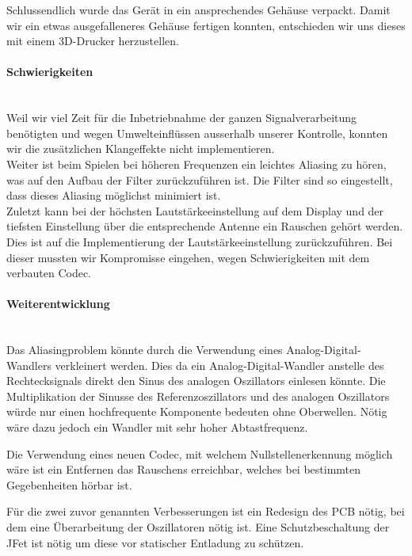 Schlussendlich wurde das Gerät in ein ansprechendes Gehäuse verpackt. Damit wir ein etwas ausgefalleneres Gehäuse fertigen konnten, entschieden wir uns dieses mit einem 3D-Drucker herzustellen.

\paragraph{Schwierigkeiten}\mbox{}\\

Weil wir viel Zeit für die Inbetriebnahme der ganzen Signalverarbeitung benötigten und wegen Umwelteinflüssen ausserhalb unserer Kontrolle, konnten wir die zusätzlichen Klangeffekte nicht implementieren.\\
Weiter ist beim Spielen bei höheren Frequenzen ein leichtes Aliasing zu hören, was auf den Aufbau der Filter zurückzuführen ist. Die Filter sind so eingestellt, dass dieses Aliasing möglichst minimiert ist.\\
Zuletzt kann bei der höchsten Lautstärkeeinstellung auf dem Display und der tiefsten Einstellung über die entsprechende Antenne ein Rauschen gehört werden. Dies ist auf die Implementierung der Lautstärkeeinstellung zurückzuführen. Bei dieser mussten wir Kompromisse eingehen, wegen Schwierigkeiten mit dem verbauten Codec.

\paragraph{Weiterentwicklung}\mbox{}\\

Das Aliasingproblem könnte durch die Verwendung eines Analog-Digital-Wandlers verkleinert werden. Dies da ein Analog-Digital-Wandler anstelle des Rechtecksignals direkt den Sinus des analogen Oszillators einlesen könnte. Die Multiplikation der Sinusse des Referenzoszillators und des analogen Oszillators würde nur einen hochfrequente Komponente bedeuten ohne Oberwellen. Nötig wäre dazu jedoch ein Wandler mit sehr hoher Abtastfrequenz.

Die Verwendung eines neuen Codec, mit welchem Nullstellenerkennung möglich wäre ist ein Entfernen das Rauschens erreichbar, welches bei bestimmten Gegebenheiten hörbar ist.

Für die zwei zuvor genannten Verbesserungen ist ein Redesign des PCB nötig, bei dem eine Überarbeitung der Oszillatoren nötig ist. Eine Schutzbeschaltung der JFet ist nötig um diese vor statischer Entladung zu schützen.
